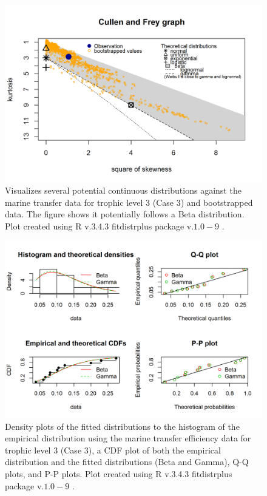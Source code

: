 \documentclass[oneside,12pt,final]{sty/ucthesis-CA2012}
\let\cite\citep                             %
\begin{document}
\begin{mainmatter}
\begin{figure}[H]
     \centering
       \includegraphics[width=.8\textwidth]{fig/cullen_frey_te3}
    \caption{Visualizes several potential continuous distributions against the marine transfer data for trophic level 3 (Case 3) and bootstrapped data. The figure shows it potentially follows a Beta distribution. Plot created using R v.3.4.3 \cite{Rcite} fitdistrplus package v.$1.0-9$ \cite{fitdistrplus}. }
    \label{cf_te3}
\end{figure}

\begin{figure}[H]
     \centering
       \includegraphics[width=.8\textwidth]{fig/gof_te3}
    \caption{Density plots of the fitted distributions to the histogram of the empirical distribution using the marine transfer efficiency data for trophic level 3 (Case 3), a CDF plot of both the empirical distribution and the fitted distributions (Beta and Gamma), Q-Q plots, and P-P plots. Plot created using R v.3.4.3 \cite{Rcite} fitdistrplus package v.$1.0-9$ \cite{fitdistrplus}. }
    \label{gof_te3}
\end{figure}


\end{mainmatter}
\end{document}
